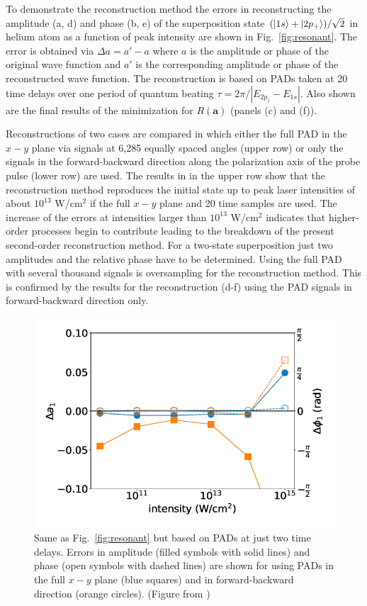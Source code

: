 To demonstrate the reconstruction method the errors in reconstructing the amplitude (a, d) and phase (b, e) of the superposition state $(\ket{1s}+\ket{2p_+})/\sqrt{2}$ in helium atom as a function of peak intensity are shown in Fig.~\ref{fig:resonant}. The error is obtained via $\Delta a = a'-a$ where $a$ is the amplitude or phase of the original wave function and $a'$ is the corresponding amplitude or phase of the reconstructed wave function. The reconstruction is based on PADs taken at 20 time delays over one period of quantum beating $\tau = 2\pi / |E_{2p_1}-E_{1s}|$. Also shown are the final results of the minimization for $R(\mathbf{a})$  (panels (c) and (f)).

 Reconstructions of two cases are compared in which either the full PAD in the $x-y$ plane via signals at 6,285 equally spaced angles  (upper row) or only the signals in the forward-backward direction along the polarization axis of the probe pulse  (lower row) are used. The results in in the upper row show that  the reconstruction method reproduces the initial state up to peak laser intensities of about $10^{13}$ W/cm$^2$ if the full $x-y$ plane and 20 time samples are used. The increase of the errors at intensities larger than $10^{13}$ W/cm$^2$ indicates that higher-order processes  begin to contribute leading to the breakdown of the present second-order reconstruction method. For a two-state superposition just two amplitudes and the relative phase have to be determined. Using the full PAD with several thousand signals is oversampling for the reconstruction method. 
This is confirmed by the results for the reconstruction (d-f) using the PAD signals in forward-backward direction only. 

\begin{figure}[!ht]
\centering
\includegraphics[width=0.5\linewidth]{figs/Photo_ionization/superpositions/Venzke_new_fig_4.png}
\caption{
Same as Fig.\ \ref{fig:resonant} but based on PADs at just two time delays. Errors in amplitude (filled symbols with solid lines) and phase (open symbols with dashed lines) are shown for using PADs in the full $x-y$ plane (blue squares) and in forward-backward direction (orange circles). (Figure from \cite{venzke2021_wave})
} 
  \label{fig:twosamples}
\end{figure}


